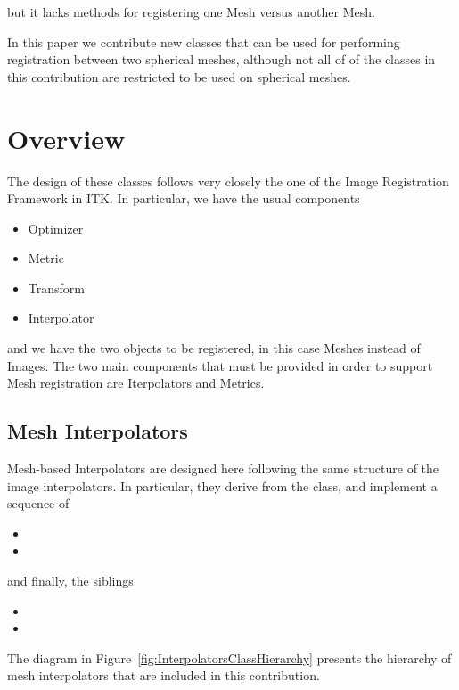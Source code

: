 \documentclass{InsightArticle}
\begin{document}
but it lacks methods for registering one Mesh versus another Mesh.

In this paper we contribute new classes that can be used for performing
registration between two spherical meshes, although not all of of the classes
in this contribution are restricted to be used on spherical meshes.

\section{Overview}

The design of these classes follows very closely the one of the Image
Registration Framework in ITK.  In particular, we have the usual components

\begin{itemize}
\item Optimizer
\item Metric
\item Transform
\item Interpolator
\end{itemize}

and we have the two objects to be registered, in this case Meshes instead of
Images. The two main components that must be provided in order to support Mesh
registration are Iterpolators and Metrics.

\subsection{Mesh Interpolators}

Mesh-based Interpolators are designed here following the same structure of the
image interpolators. In particular, they derive from the 
class, and implement a sequence of 

\begin{itemize}
\item {}
\item {}
\end{itemize}

 and finally, the siblings

\begin{itemize}
\item {}
\item {}
\end{itemize}

The diagram in Figure~\ref{fig:InterpolatorsClassHierarchy} presents the hierarchy of mesh
interpolators that are included in this contribution.
\end{document}
